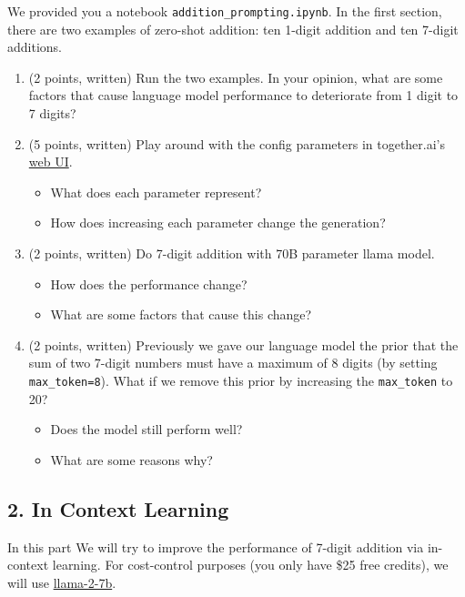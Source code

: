 \documentclass{article}
\theoremstyle{case}
\theoremstyle{definition}
\begin{document}
We provided you a notebook \texttt{addition\_prompting.ipynb}. In the first section, there are two examples of zero-shot addition: ten 1-digit addition and ten 7-digit additions.

\begin{enumerate}[label=\alph*.]
    \item (2 points, written) Run the two examples. In your opinion, what are some factors that cause language model performance to deteriorate from 1 digit to 7 digits?
    \newpage
    \item (5 points, written) Play around with the config parameters in together.ai's \href{https://api.together.xyz/playground/language/togethercomputer/llama-2-7b}{web UI}.
    \begin{itemize}
        \item What does each parameter represent?
        \item How does increasing each parameter change the generation?
    \end{itemize} 
    \newpage
    \item (2 points, written) Do 7-digit addition with 70B parameter llama model. 
    \begin{itemize}
        \item How does the performance change?
        \item What are some factors that cause this change?
    \end{itemize}
    \newpage
    \item (2 points, written) Previously we gave our language model the prior that the sum of two 7-digit numbers must have a maximum of 8 digits (by setting \texttt{max\_token=8}). What if we remove this prior by increasing the \texttt{max\_token} to 20? 
    \begin{itemize}
        \item  Does the model still perform well?
        \item What are some reasons why?
    \end{itemize}
\end{enumerate}

\newpage
\subsection*{2. In Context Learning}

In this part We will try to improve the performance of 7-digit addition via in-context learning.
For cost-control purposes (you only have \$25 free credits), we will use \href{https://api.together.xyz/playground/language/togethercomputer/llama-2-7b}{llama-2-7b}.
\end{document}
